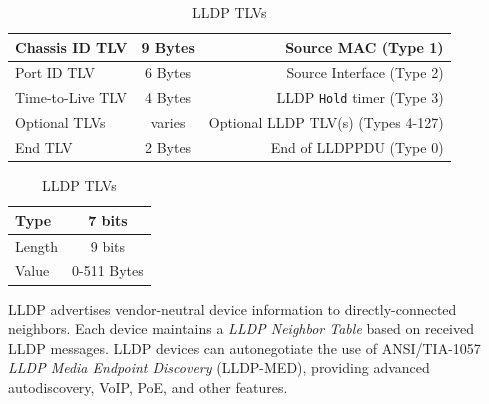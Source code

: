 \documentclass[12pt]{article}
\begin{document}
	\begin{table}[H]
	\begin{minipage}{.75\linewidth}
	\centering
	\caption{IEEE 802.1AB LLDP Header Format \label{tab:802.1AB}}
	\begin{tabular}{| l | c | r |}
	\hline
	Chassis ID TLV	& 9 Bytes	& Source MAC (Type 1)\\\hline
	Port ID TLV		& 6 Bytes	& Source Interface (Type 2)\\\hline
	Time-to-Live TLV	& 4 Bytes	& LLDP \texttt{Hold} timer (Type 3)\\\hline
	Optional TLVs	& varies	& Optional LLDP TLV(s) (Types 4-127)\\\hline
	End TLV		& 2 Bytes	& End of LLDPPDU (Type 0)\\\hline
	\end{tabular}\end{minipage}\hfill
	\begin{minipage}{.24\linewidth}
	\centering
	\caption{LLDP TLVs \label{tab:LLDP TLV}}
	\begin{tabular}{| l | c |}
	\hline
	Type		& 7 bits\\\hline
	Length	& 9 bits\\\hline
	Value		& 0-511 Bytes\\\hline
	\end{tabular}\end{minipage}\end{table}
	LLDP advertises vendor-neutral device information to directly-connected neighbors. Each device maintains a \textit{LLDP Neighbor Table} based on received LLDP messages. LLDP devices can autonegotiate the use of ANSI/TIA-1057 \textit{LLDP Media Endpoint Discovery} (LLDP-MED), providing advanced autodiscovery, VoIP, PoE, and other features.


\end{document}
